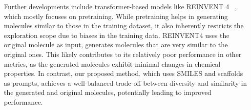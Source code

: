 Further developments include transformer-based models like REINVENT 4 ~\citep{he2021molecular, he2022transformer, loeffler2024reinvent}, which mostly focuses on pretraining. While pretraining helps in generating molecules similar to those in the training dataset, it also inherently restricts the exploration scope due to biases in the training data.
REINVENT4 uses the original molecule as input, generates molecules that are very similar to the original ones. This likely contributes to its relatively poor performance in other metrics, as the generated molecules exhibit minimal changes in chemical properties. 
In contrast, our proposed method, which uses SMILES and scaffolds as prompts, achieves a well-balanced trade-off between diversity and similarity in the generated and original molecules, potentially leading to improved performance.